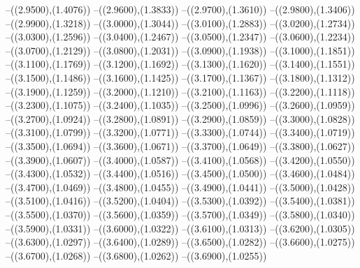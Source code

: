 {	--({\sx*(2.9500)},{\sy*(1.4076)})
	--({\sx*(2.9600)},{\sy*(1.3833)})
	--({\sx*(2.9700)},{\sy*(1.3610)})
	--({\sx*(2.9800)},{\sy*(1.3406)})
	--({\sx*(2.9900)},{\sy*(1.3218)})
	--({\sx*(3.0000)},{\sy*(1.3044)})
	--({\sx*(3.0100)},{\sy*(1.2883)})
	--({\sx*(3.0200)},{\sy*(1.2734)})
	--({\sx*(3.0300)},{\sy*(1.2596)})
	--({\sx*(3.0400)},{\sy*(1.2467)})
	--({\sx*(3.0500)},{\sy*(1.2347)})
	--({\sx*(3.0600)},{\sy*(1.2234)})
	--({\sx*(3.0700)},{\sy*(1.2129)})
	--({\sx*(3.0800)},{\sy*(1.2031)})
	--({\sx*(3.0900)},{\sy*(1.1938)})
	--({\sx*(3.1000)},{\sy*(1.1851)})
	--({\sx*(3.1100)},{\sy*(1.1769)})
	--({\sx*(3.1200)},{\sy*(1.1692)})
	--({\sx*(3.1300)},{\sy*(1.1620)})
	--({\sx*(3.1400)},{\sy*(1.1551)})
	--({\sx*(3.1500)},{\sy*(1.1486)})
	--({\sx*(3.1600)},{\sy*(1.1425)})
	--({\sx*(3.1700)},{\sy*(1.1367)})
	--({\sx*(3.1800)},{\sy*(1.1312)})
	--({\sx*(3.1900)},{\sy*(1.1259)})
	--({\sx*(3.2000)},{\sy*(1.1210)})
	--({\sx*(3.2100)},{\sy*(1.1163)})
	--({\sx*(3.2200)},{\sy*(1.1118)})
	--({\sx*(3.2300)},{\sy*(1.1075)})
	--({\sx*(3.2400)},{\sy*(1.1035)})
	--({\sx*(3.2500)},{\sy*(1.0996)})
	--({\sx*(3.2600)},{\sy*(1.0959)})
	--({\sx*(3.2700)},{\sy*(1.0924)})
	--({\sx*(3.2800)},{\sy*(1.0891)})
	--({\sx*(3.2900)},{\sy*(1.0859)})
	--({\sx*(3.3000)},{\sy*(1.0828)})
	--({\sx*(3.3100)},{\sy*(1.0799)})
	--({\sx*(3.3200)},{\sy*(1.0771)})
	--({\sx*(3.3300)},{\sy*(1.0744)})
	--({\sx*(3.3400)},{\sy*(1.0719)})
	--({\sx*(3.3500)},{\sy*(1.0694)})
	--({\sx*(3.3600)},{\sy*(1.0671)})
	--({\sx*(3.3700)},{\sy*(1.0649)})
	--({\sx*(3.3800)},{\sy*(1.0627)})
	--({\sx*(3.3900)},{\sy*(1.0607)})
	--({\sx*(3.4000)},{\sy*(1.0587)})
	--({\sx*(3.4100)},{\sy*(1.0568)})
	--({\sx*(3.4200)},{\sy*(1.0550)})
	--({\sx*(3.4300)},{\sy*(1.0532)})
	--({\sx*(3.4400)},{\sy*(1.0516)})
	--({\sx*(3.4500)},{\sy*(1.0500)})
	--({\sx*(3.4600)},{\sy*(1.0484)})
	--({\sx*(3.4700)},{\sy*(1.0469)})
	--({\sx*(3.4800)},{\sy*(1.0455)})
	--({\sx*(3.4900)},{\sy*(1.0441)})
	--({\sx*(3.5000)},{\sy*(1.0428)})
	--({\sx*(3.5100)},{\sy*(1.0416)})
	--({\sx*(3.5200)},{\sy*(1.0404)})
	--({\sx*(3.5300)},{\sy*(1.0392)})
	--({\sx*(3.5400)},{\sy*(1.0381)})
	--({\sx*(3.5500)},{\sy*(1.0370)})
	--({\sx*(3.5600)},{\sy*(1.0359)})
	--({\sx*(3.5700)},{\sy*(1.0349)})
	--({\sx*(3.5800)},{\sy*(1.0340)})
	--({\sx*(3.5900)},{\sy*(1.0331)})
	--({\sx*(3.6000)},{\sy*(1.0322)})
	--({\sx*(3.6100)},{\sy*(1.0313)})
	--({\sx*(3.6200)},{\sy*(1.0305)})
	--({\sx*(3.6300)},{\sy*(1.0297)})
	--({\sx*(3.6400)},{\sy*(1.0289)})
	--({\sx*(3.6500)},{\sy*(1.0282)})
	--({\sx*(3.6600)},{\sy*(1.0275)})
	--({\sx*(3.6700)},{\sy*(1.0268)})
	--({\sx*(3.6800)},{\sy*(1.0262)})
	--({\sx*(3.6900)},{\sy*(1.0255)})
}

